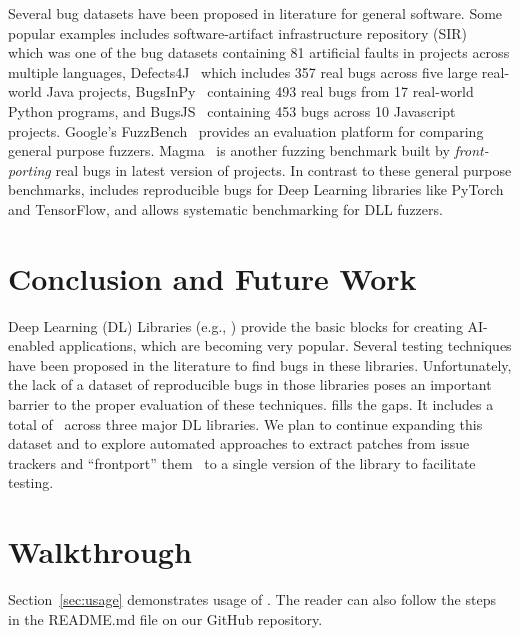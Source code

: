 \documentclass[sigconf,screen]{acmart}
\begin{document}
Several bug datasets have been proposed in literature for general
software. Some popular examples includes software-artifact
infrastructure repository (SIR)~\cite{do2005supporting} which was one
of the bug datasets containing 81 artificial faults in projects across
multiple languages, Defects4J~\cite{just2014defects4j} which includes
357 real bugs across five large real-world Java projects,
BugsInPy~\cite{widyasari2020bugsinpy} containing 493 real bugs from 17
real-world Python programs, and BugsJS~\cite{vancsics2020relationship}
containing 453 bugs across 10 Javascript projects.
%
Google's FuzzBench~\cite{metzman2021fuzzbench} provides an evaluation platform
for comparing general purpose fuzzers. Magma~\cite{hazimeh2020magma} is another
fuzzing benchmark built by \emph{front-porting} real bugs in latest version of
projects. In contrast to these general purpose benchmarks, \tname includes
reproducible bugs for Deep Learning libraries like PyTorch and TensorFlow, and
allows systematic benchmarking for DLL fuzzers. 


\section{Conclusion and Future Work}
Deep Learning (DL) Libraries (e.g., \torch) provide the basic blocks
for creating AI-enabled applications, which are becoming very
popular. Several testing techniques have been proposed in the
literature to find bugs in these libraries. Unfortunately, the lack of
a dataset of reproducible bugs in those libraries poses an important
barrier to the proper evaluation of these techniques. \tname{} fills
the gaps. It includes a total of \numbugs\ across three major DL
libraries. We plan to continue expanding this dataset and to explore
automated approaches to extract patches from issue trackers and
``frontport'' them~\cite{hazimeh2020magma} to a single version of the
library to facilitate testing.


\balance



\appendix

\section{Walkthrough}

Section~\ref{sec:usage} demonstrates usage of \tname. The reader can
also follow the steps in the README.md file on our GitHub repository.
\end{document}
